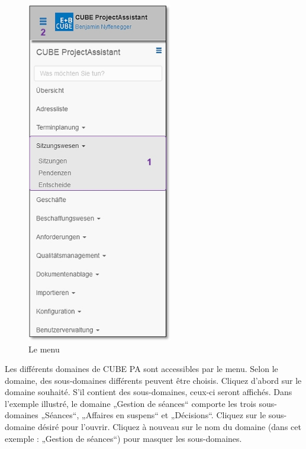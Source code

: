 \begin{figure}   %
  \vspace{-25pt}      %
  \begin{center}
    \includegraphics[height=150mm]{../chapters/01_Einfuehrung/pictures/1-3-1_Menuuebersicht_oSitzungswesen.jpg}
  \end{center}
  \vspace{-20pt}
  \caption{Le menu}
  \vspace{-10pt}
\end{figure}
Les différents domaines de CUBE PA sont accessibles par le menu. Selon le domaine, des sous-domaines différents peuvent être choisis. Cliquez d'abord sur le domaine souhaité. S'il contient des sous-domaines, ceux-ci seront affichés. Dans l'exemple illustré, le domaine „Gestion de séances“  comporte les trois sous-domaines „Séances“, „Affaires en suspens“ et „Décisions“. Cliquez sur le sous-domaine désiré pour l'ouvrir. Cliquez à nouveau sur le nom du domaine (dans cet exemple : „Gestion de séances“) pour masquer les sous-domaines. 

